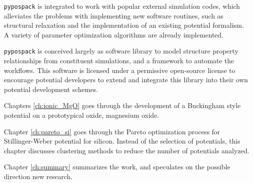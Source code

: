 \verb|pypospack| is integrated to work with popular external simulation codes, which alleviates the problems with implementing new software routines, such as structural relaxation and the implementation of an existing potential formalism.  A variety of parameter optimization algorithms are already implemented.

\verb|pypospack| is conceived largely as software library to model structure property relationships from constituent simulations, and a framework to automate the workflows.  This software is licensed under a permissive open-source license to encourage potential developers to extend and integrate this library into their own potential development schemes.

Chapters \ref{ch:ionic_MgO} goes through the development of a Buckingham style potential on a prototypical oxide, magnesium oxide.

Chapter \ref{ch:pareto_si} goes through the Pareto optimization process for Stillinger-Weber potential for silicon.  Instead of the selection of potentials, this chapter discusses clustering methods to reduce the number of potentials analyzed.

Chapter \ref{ch:summary} summarizes the work, and speculates on the possible direction new research.
